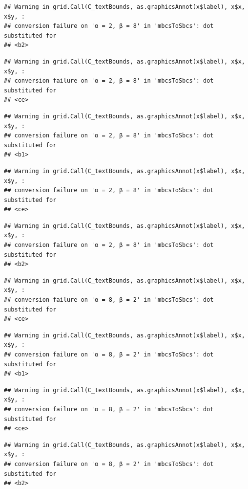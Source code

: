 \documentclass[]{book}
\theoremstyle{definition}
\theoremstyle{definition}
\theoremstyle{definition}
\theoremstyle{remark}
\begin{document}
\begin{verbatim}
## Warning in grid.Call(C_textBounds, as.graphicsAnnot(x$label), x$x, x$y, :
## conversion failure on 'α = 2, β = 8' in 'mbcsToSbcs': dot substituted for
## <b2>
\end{verbatim}

\begin{verbatim}
## Warning in grid.Call(C_textBounds, as.graphicsAnnot(x$label), x$x, x$y, :
## conversion failure on 'α = 2, β = 8' in 'mbcsToSbcs': dot substituted for
## <ce>
\end{verbatim}

\begin{verbatim}
## Warning in grid.Call(C_textBounds, as.graphicsAnnot(x$label), x$x, x$y, :
## conversion failure on 'α = 2, β = 8' in 'mbcsToSbcs': dot substituted for
## <b1>
\end{verbatim}

\begin{verbatim}
## Warning in grid.Call(C_textBounds, as.graphicsAnnot(x$label), x$x, x$y, :
## conversion failure on 'α = 2, β = 8' in 'mbcsToSbcs': dot substituted for
## <ce>
\end{verbatim}

\begin{verbatim}
## Warning in grid.Call(C_textBounds, as.graphicsAnnot(x$label), x$x, x$y, :
## conversion failure on 'α = 2, β = 8' in 'mbcsToSbcs': dot substituted for
## <b2>
\end{verbatim}

\begin{verbatim}
## Warning in grid.Call(C_textBounds, as.graphicsAnnot(x$label), x$x, x$y, :
## conversion failure on 'α = 8, β = 2' in 'mbcsToSbcs': dot substituted for
## <ce>
\end{verbatim}

\begin{verbatim}
## Warning in grid.Call(C_textBounds, as.graphicsAnnot(x$label), x$x, x$y, :
## conversion failure on 'α = 8, β = 2' in 'mbcsToSbcs': dot substituted for
## <b1>
\end{verbatim}

\begin{verbatim}
## Warning in grid.Call(C_textBounds, as.graphicsAnnot(x$label), x$x, x$y, :
## conversion failure on 'α = 8, β = 2' in 'mbcsToSbcs': dot substituted for
## <ce>
\end{verbatim}

\begin{verbatim}
## Warning in grid.Call(C_textBounds, as.graphicsAnnot(x$label), x$x, x$y, :
## conversion failure on 'α = 8, β = 2' in 'mbcsToSbcs': dot substituted for
## <b2>
\end{verbatim}
\end{document}
